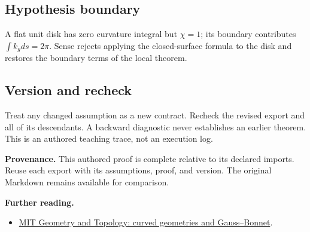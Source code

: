 \documentclass[preprint,12pt,aps,pra,showkeys,amsmath,amssymb,superscriptaddress,floatfix]{revtex4-2}
\theoremstyle{definition}
\theoremstyle{remark}
\providecommand{\tightlist}{\setlength{\itemsep}{2pt}\setlength{\parskip}{0pt}}
\begin{document}
\subsection{Hypothesis boundary}
A flat unit disk has zero curvature integral but \(\chi =1\); its
boundary contributes \(\int k_gds=2\pi\). Sense rejects applying the
closed-surface formula to the disk and restores the boundary terms of
the local theorem.

\subsection{Version and recheck}
Treat any changed assumption as a new contract. Recheck the revised
export and all of its descendants. A backward diagnostic never
establishes an earlier theorem. This is an authored teaching trace, not
an execution log.

\par\medskip\begingroup\small\linespread{1.0}\selectfont\noindent\textbf{Provenance.} This authored proof is complete relative to its declared imports. Reuse
each export with its assumptions, proof, and version. The original
Markdown remains available for comparison.
\par\endgroup

\par\smallskip\begingroup\small\linespread{1.0}\selectfont\noindent\textbf{Further reading.} \begin{itemize}
\tightlist
\item
  \href{https://ocw.mit.edu/courses/18-900-geometry-and-topology-in-the-plane-spring-2023/pages/chapter-ix-curved-geometries/}{MIT
  Geometry and Topology: curved geometries and Gauss--Bonnet}.
\end{itemize}\par\endgroup
\end{document}
